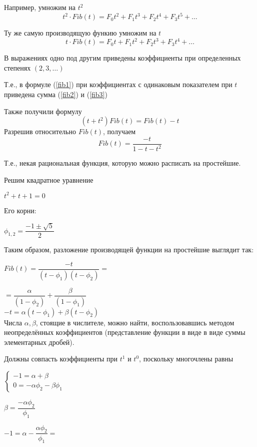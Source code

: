 Например, умножим на $ t^{2} $
\begin{equation}
\label{fib2}
t^2 \cdot Fib(t) = F_0 t^2 +  F_1 t^3 + F_2 t^4 + F_3 t^5 + \ldots
\end{equation}

Ту же самую производящую функию умножим на $ t $
\begin{equation}
\label{fib3}
t \cdot Fib(t) = F_0 t +  F_1 t^2 + F_2 t^3+ F_3 t^4 + \ldots
\end{equation}

В выражениях одно под другим приведены коэффициенты при определенных степенях $ (2,3,\ldots) $

Т.е., в формуле (\ref{fib1}) при коэффициентах с одинаковым показателем при $ t $ приведена сумма 
(\ref{fib2}) и (\ref{fib3})

Также получили формулу
$$
(t + t^2) Fib(t) = Fib(t) - t
$$
Разрешив относительно $ Fib(t) $, получаем
$$
Fib(t) = \dfrac{-t}{1-t-t^2}
$$

Т.е., некая рациональная функция, которую можно расписать на простейшие.

Решим квадратное уравнение

$t^2 + t + 1 = 0$

Его корни:

$\phi_{1,2} = \dfrac{-1 \pm \sqrt{5}}{2}$

Таким образом, разложение производящей функции на простейшие выглядит так:

$ Fib(t) = \dfrac{-t}{(t-\phi_1)(t-\phi_2)} =$

$ = 
\dfrac{\alpha}{(1-\phi_2)}  
+
\dfrac{\beta}{(1-\phi_1)}$ \\

$ -t = \alpha(t - \phi_1) + \beta (t - \phi_2)$ \\

Числа $ \alpha, \beta $, стоящие в числителе, можно найти, воспользовавшись 
методом неопределённых коэффициентов 
(представление  функции в виде в виде суммы элементарных дробей).

Должны совпасть коэффициенты при $ t^{1} $ и $ t^{0} $, поскольку многочлены равны


$\begin{cases}
- 1 = \alpha + \beta \\
0 = - \alpha \phi_2 - \beta \phi_1
\end{cases}$

$\beta = 
\dfrac{-\alpha \phi_2}
{\phi_1} $ 

$ -1 = \alpha - \dfrac{\alpha  \phi_2}{\phi_1} = $ 

